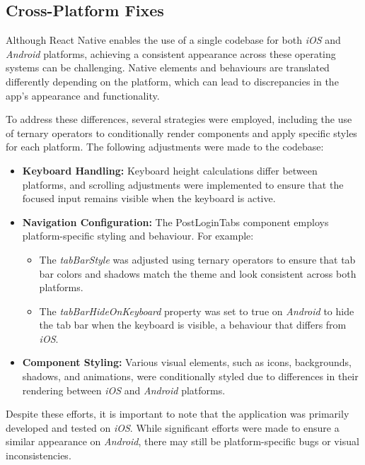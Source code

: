 \subsection{Cross-Platform Fixes}

Although React Native enables the use of a single codebase for both \textit{iOS} and \textit{Android} platforms, achieving a consistent appearance across these operating systems can be challenging. Native elements and behaviours are translated differently depending on the platform, which can lead to discrepancies in the app's appearance and functionality.

To address these differences, several strategies were employed, including the use of ternary operators to conditionally render components and apply specific styles for each platform. The following adjustments were made to the codebase:

\begin{itemize}
    \item \textbf{Keyboard Handling:} Keyboard height calculations differ between platforms, and scrolling adjustments were implemented to ensure that the focused input remains visible when the keyboard is active. 
    \item \textbf{Navigation Configuration:} The PostLoginTabs component employs platform-specific styling and behaviour. For example:
    \begin{itemize}
        \item The \textit{tabBarStyle} was adjusted using ternary operators to ensure that tab bar colors and shadows match the theme and look consistent across both platforms.
        \item The \textit{tabBarHideOnKeyboard} property was set to true on \textit{Android} to hide the tab bar when the keyboard is visible, a behaviour that differs from \textit{iOS}.
    \end{itemize}
    \item \textbf{Component Styling:} Various visual elements, such as icons, backgrounds, shadows, and animations, were conditionally styled due to differences in their rendering between \textit{iOS} and \textit{Android} platforms.
\end{itemize}

Despite these efforts, it is important to note that the application was primarily developed and tested on \textit{iOS}. While significant efforts were made to ensure a similar appearance on \textit{Android}, there may still be platform-specific bugs or visual inconsistencies.
